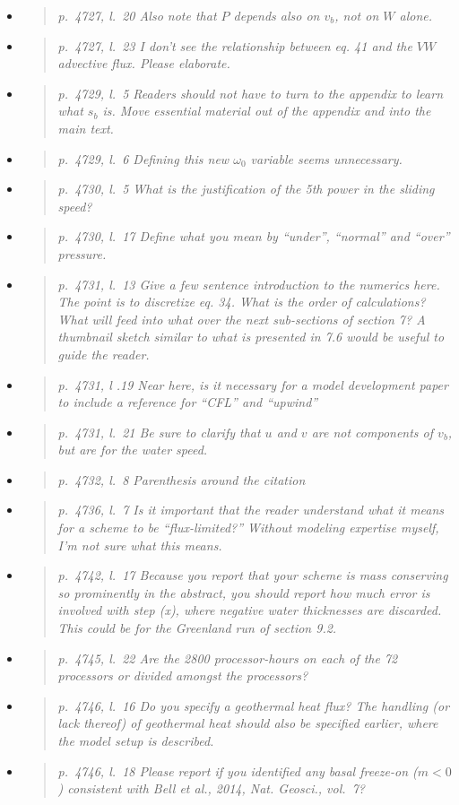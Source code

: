 \documentclass[11pt,reqno]{amsart}
\newcommand{\reply}[2]{
\medskip\medskip
\item  \begin{quote}
\emph{#1}
\end{quote}

\medskip
\noindent #2}
\begin{document}
\begin{itemize}
\reply{p.~4727, l.~20 Also note that $P$ depends also on $v_b$, not on $W$ alone.}
{}

\reply{p.~4727, l.~23 I don’t see the relationship between eq. 41 and the $VW$ advective flux.
Please elaborate.}
{}

\reply{p.~4729, l.~5 Readers should not have to turn to the appendix to learn what $s_b$ is.
Move essential material out of the appendix and into the main text.}
{}

\reply{p.~4729, l.~6 Defining this new $\omega_0$ variable seems unnecessary.}
{}

\reply{p.~4730, l.~5 What is the justification of the 5th power in the sliding speed?}
{}

\reply{p.~4730, l.~17 Define what you mean by ``under'', ``normal'' and ``over'' pressure.}
{}

\reply{p.~4731, l.~13 Give a few sentence introduction to the numerics here. The point is to
discretize eq. 34. What is the order of calculations? What will feed into what over the
next sub-sections of section 7? A thumbnail sketch similar to what is presented in 7.6
would be useful to guide the reader.}
{}

\reply{p.~4731, l .19 Near here, is it necessary for a model development paper to include a
reference for ``CFL'' and ``upwind''}
{}

\reply{p.~4731, l.~21 Be sure to clarify that $u$ and $v$ are not components of $v_b$, but are for the water speed.}
{}

\reply{p.~4732, l.~8 Parenthesis around the citation}
{}

\reply{p.~4736, l.~7 Is it important that the reader understand what it means for a scheme to
be ``flux-limited?'' Without modeling expertise myself, I’m not sure what this means.}
{}

\reply{p.~4742, l.~17 Because you report that your scheme is mass conserving so prominently
in the abstract, you should report how much error is involved with step (x), where
negative water thicknesses are discarded. This could be for the Greenland run of
section 9.2.}
{}

\reply{p.~4745, l.~22 Are the 2800 processor-hours on each of the 72 processors or divided
amongst the processors?}
{}

\reply{p.~4746, l.~16 Do you specify a geothermal heat flux? The handling (or lack thereof) of
geothermal heat should also be specified earlier, where the model setup is described.}
{}

\reply{p.~4746, l.~18 Please report if you identified any basal freeze-on ($m < 0$) consistent with
Bell et al., 2014, Nat. Geosci., vol.~7?}
{}


\end{itemize}
\end{document}
